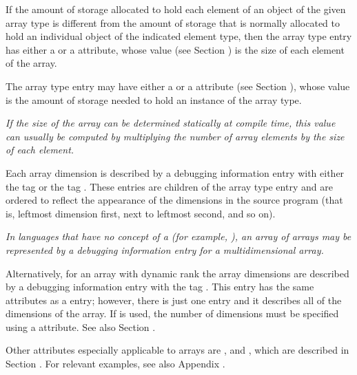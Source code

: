 If the amount of storage allocated to hold each element of an
object of the given array type is different from the amount
of storage that is normally allocated to hold an individual object
of\hypertarget{chap:DWATbitstridearrayelementstrideofarraytype}{}
the\hypertarget{chap:DWATbytestridearrayelementstrideofarraytype}{}
indicated element type, then the array type entry has either a
\DWATbytestrideDEFN{} 
or a
\DWATbitstrideDEFN{}
attribute, whose value 
(see Section ) 
is the size of each
element of the array.

The array type entry may have either a \DWATbytesize{} or a
\DWATbitsize{} attribute 
(see Section ), 
whose value is the
amount of storage needed to hold an instance of the array type.

\textit{If the size of the array can be determined statically at
compile time, this value can usually be computed by multiplying
the number of array elements by the size of each element.}


Each array dimension is described by a debugging information
entry with either the 
tag \DWTAGsubrangetype{} or the 
tag
\DWTAGenumerationtype. These entries are
children of the
array type entry and are ordered to reflect the appearance of
the dimensions in the source program (that is, leftmost dimension
first, next to leftmost second, and so on).

\textit{In languages that have no concept of a 
 (for example, 
), an array of arrays may
be represented by a debugging information entry for a
multidimensional array.}

Alternatively, for an array with dynamic rank the array dimensions 
are described by a debugging information entry with the tag
\DWTAGgenericsubrangeTARG.
This entry has the same attributes as a
\DWTAGsubrangetype{} entry; however,
there is just one \DWTAGgenericsubrangeNAME{} entry and it describes all of the
dimensions of the array.
If \DWTAGgenericsubrangeNAME{}
is used, the number of dimensions must be specified using a
\DWATrank{} attribute. See also Section
.

Other attributes especially applicable to arrays are
\DWATallocated, 
\DWATassociated{} and 
\DWATdatalocation,
which are described in 
Section . 
For relevant examples, see also Appendix .

